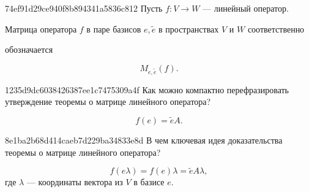 \begin{note}{74ef91d29ce940f8b894341a5836c812}
    Пусть \( f : V \to W \) --- линейный оператор.
    \begin{icloze}{2}Матрица оператора \({ f }\) в паре базисов \({ e, \tilde e }\) в пространствах \({ V }\) и \({ W }\) соответственно\end{icloze} обозначается
    \begin{icloze}{1}
        \[
            M_{e,\tilde e} (f).
        \]
    \end{icloze}
\end{note}


\begin{note}{1235d9dc6038426387ee1c7475309a4f}
    Как можно компактно перефразировать утверждение теоремы о матрице линейного оператора?

    \begin{cloze}{1}
        \[
            f(e) = \tilde e A.
        \]
    \end{cloze}
\end{note}

\begin{note}{8e1ba2b68d414caeb7d229ba34833e8d}
    В чем ключевая идея доказательства теоремы о матрице линейного оператора?

    \begin{cloze}{1}
        \[
            f(e\lambda) = f(e)\lambda = \tilde e A \lambda,
        \]
        где \( \lambda \) --- координаты вектора из \( V \) в базисе \( e \).
    \end{cloze}
\end{note}

